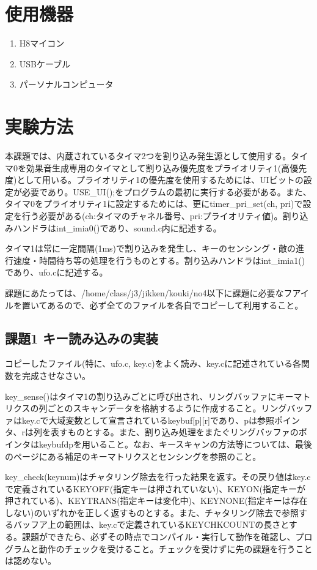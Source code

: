 ﻿\documentclass{jarticle}
\begin{document}
\section{使用機器}
\begin{enumerate}
\item H8マイコン
\item USBケーブル
\item パーソナルコンピュータ
\end{enumerate}

\section{実験方法}
本課題では、内蔵されているタイマ2つを割り込み発生源として使用する。タイマ0を効果音生成専用のタイマとして割り込み優先度をプライオリティ1(高優先度)として用いる。プライオリティ1の優先度を使用するためには、UIビットの設定が必要であり。USE\_UI();をプログラムの最初に実行する必要がある。また、タイマ0をプライオリティ1に設定するためには、更にtimer\_pri\_set(ch, pri)で設定を行う必要がある(ch:タイマのチャネル番号、pri:プライオリティ値)。割り込みハンドラはint\_imia0()であり、sound.c内に記述する。


タイマ1は常に一定間隔(1ms)で割り込みを発生し、キーのセンシング・敵の進行速度・時間待ち等の処理を行うものとする。割り込みハンドラはint\_imia1()であり、ufo.cに記述する。


課題にあたっては、/home/class/j3/jikken/kouki/no4以下に課題に必要なフアイルを置いてあるので、必ず全てのファイルを各自でコピーして利用すること。


\subsection{課題1 キー読み込みの実装}
コピーしたファイル(特に、ufo.c, key.c)をよく読み、key.cに記述されている各関数を完成させなさい。


key\_sense()はタイマ1の割り込みごとに呼び出され、リングバッファにキーマトリクスの列ごとのスキャンデータを格納するように作成すること。リングバッファはkey.cで大域変数として宣言されているkeybuf[p][r]であり、pは参照ポインタ、rは列を表すものとする。また、割り込み処理をまたぐリングバッファのポインタはkeybufdpを用いること。なお、キースキャンの方法等については、最後のページにある補足のキーマトリクスとセンシングを参照のこと。


key\_check(keynum)はチャタリング除去を行った結果を返す。その戻り値はkey.cで定義されているKEYOFF(指定キーは押されていない)、KEYON(指定キーが押されている)、KEYTRANS(指定キーは変化中)、KEYNONE(指定キーは存在しない)のいずれかを正しく返すものとする。また、チャタリング除去で参照するバッフア上の範囲は、key.cで定義されているKEYCHKCOUNTの長さとする。課題ができたら、必ずその時点でコンパイル・実行して動作を確認し、プログラムと動作のチェックを受けること。チェックを受けずに先の課題を行うことは認めない。
\end{document}
